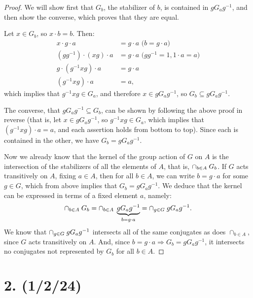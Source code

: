 \documentclass{article}
\begin{document}
\begin{proof}
    We will show first that $G_b$, the stabilizer of $b$, is contained in $gG_ag^{-1}$, and then show the converse, which proves that they are equal.

    Let $x \in G_b$, so $x \cdot b = b$. Then:
    \begin{align*}
        x \cdot g \cdot a &= g \cdot a \text{ ($b = g \cdot a$)} \\
        (gg^{-1}) \cdot (xg) \cdot a &= g \cdot a \text{ ($gg^{-1} = 1, 1 \cdot a = a$)} \\
        g \cdot (g^{-1}xg) \cdot a &= g \cdot a \\
        (g^{-1}xg) \cdot a &= a,
    \end{align*}
    which implies that $g^{-1}xg \in G_a$, and therefore $x \in gG_ag^{-1}$, so $G_b \subseteq gG_ag^{-1}$.

    The converse, that $gG_ag^{-1} \subseteq G_b$, can be shown by following the above proof in reverse (that is, let $x \in gG_ag^{-1}$, so $g^{-1}xg \in G_a$, which implies that $(g^{-1}xg) \cdot a = a$, and each assertion holds from bottom to top). Since each is contained in the other, we have $G_b = gG_ag^{-1}$.

    Now we already know that the kernel of the group action of $G$ on $A$ is the intersection of the stabilizers of all the elements of $A$, that is, $\cap_{b \in A}\hspace{0.25em}G_b$. If $G$ acts transitively on $A$, fixing $a \in A$, then for all $b \in A$, we can write $b = g \cdot a$ for some $g \in G$, which from above implies that $G_b = gG_ag^{-1}$. We deduce that the kernel can be expressed in terms of a fixed element $a$, namely:
    \begin{equation*}
        \cap_{b \in A}\hspace{0.25em}G_b = \cap_{b \in A}\hspace{0.25em}\underbrace{gG_ag^{-1}}_{b = g \cdot a} = \cap_{g \in G}\hspace{0.25em}gG_ag^{-1}.
    \end{equation*}
    We know that $\cap_{g \in G}\hspace{0.25em}gG_ag^{-1}$ intersects all of the same conjugates as does $\cap_{b \in A}$, since $G$ acts transitively on $A$. And, since $b = g \cdot a \Rightarrow G_b = gG_ag^{-1}$, it intersects no conjugates not represented by $G_b$ for all $b \in A$.
\end{proof}

\section*{2. (1/2/24)}
\end{document}

